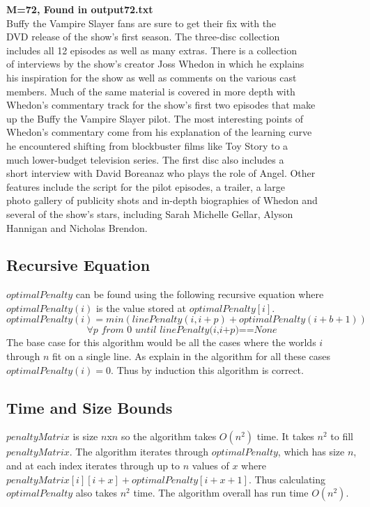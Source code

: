 \documentclass[11pt]{article}
\begin{document}
\textbf{M=72, Found in output72.txt}\\
Buffy the Vampire Slayer fans are sure to get their fix with the \\
DVD release of the show's first season. The three-disc collection \\
includes all 12 episodes as well as many extras. There is a collection \\
of interviews by the show's creator Joss Whedon in which he explains \\
his inspiration for the show as well as comments on the various cast \\
members. Much of the same material is covered in more depth with \\
Whedon's commentary track for the show's first two episodes that make \\
up the Buffy the Vampire Slayer pilot. The most interesting points of \\
Whedon's commentary come from his explanation of the learning curve \\
he encountered shifting from blockbuster films like Toy Story to a \\
much lower-budget television series. The first disc also includes a \\
short interview with David Boreanaz who plays the role of Angel. Other \\
features include the script for the pilot episodes, a trailer, a large \\
photo gallery of publicity shots and in-depth biographies of Whedon and \\
several of the show's stars, including Sarah Michelle Gellar, Alyson \\
Hannigan and Nicholas Brendon. 

\subsection*{Recursive Equation}
$optimalPenalty$ can be found using the following recursive equation where $optimalPenalty(i)$ is the value stored at $optimalPenalty[i]$.
\[optimalPenalty(i)= min(linePenalty(i,i+p)+optimalPenalty(i+b+1))\]
\[\forall p \textit{ from } 0 \textit{ until linePenalty(i,i+p)==None}\]
The base case for this algorithm would be all the cases where the worlds $i$ through $n$ fit on a single line. As explain in the algorithm for all these cases $optimalPenalty(i) = 0$. Thus by induction this algorithm is correct.

\subsection*{Time and Size Bounds}
$penaltyMatrix$ is size $n$x$n$ so the algorithm takes $O(n^2)$ time. It takes $n^2$ to fill $penaltyMatrix$. The algorithm iterates through $optimalPenalty$, which has size $n$, and at each index iterates through up to $n$ values of $x$ where $penaltyMatrix[i][i+x] + optimalPenalty[i+x+1]$. Thus calculating $optimalPenalty$ also takes $n^2$ time. The algorithm overall has run time $O(n^2)$.
\end{document}
